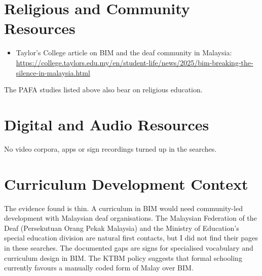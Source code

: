 \documentclass[12pt]{article}
\begin{document}
\section{Religious and Community Resources}
\begin{itemize}
\item Taylor's College article on BIM and the deaf community in Malaysia: \url{https://college.taylors.edu.my/en/student-life/news/2025/bim-breaking-the-silence-in-malaysia.html}
\end{itemize}
The PAFA studies listed above also bear on religious education.

\section{Digital and Audio Resources}
No video corpora, apps or sign recordings turned up in the searches.

\section{Curriculum Development Context}
The evidence found is thin. A curriculum in BIM would need community-led development with Malaysian deaf organisations. The Malaysian Federation of the Deaf (Persekutuan Orang Pekak Malaysia) and the Ministry of Education's special education division are natural first contacts, but I did not find their pages in these searches. The documented gaps are signs for specialised vocabulary and curriculum design in BIM. The KTBM policy suggests that formal schooling currently favours a manually coded form of Malay over BIM.
\end{document}
